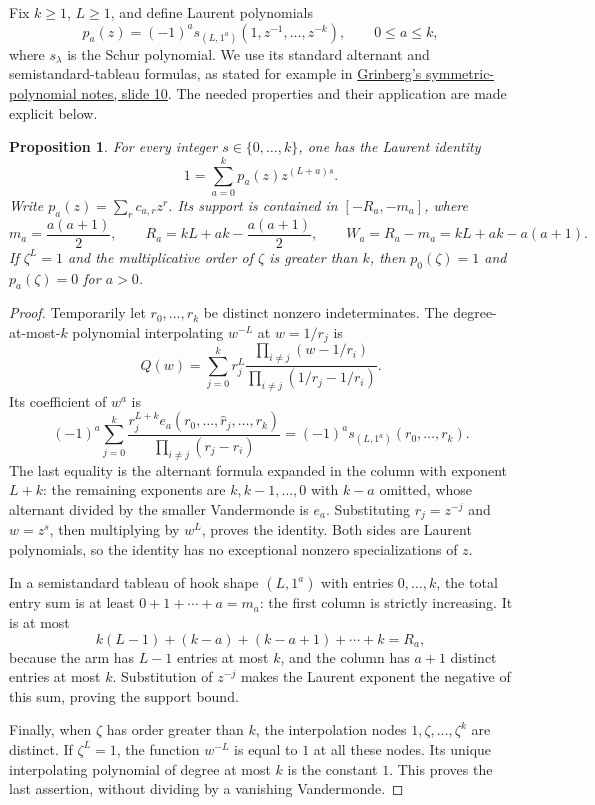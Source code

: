 \documentclass[11pt]{article}
\newtheorem{proposition}[theorem]{Proposition}
\begin{document}
Fix $k\geq1$, $L\geq1$, and define Laurent polynomials
\[
 p_a(z)=(-1)^a s_{(L,1^a)}(1,z^{-1},\ldots,z^{-k}),
 \qquad 0\leq a\leq k,
\]
where $s_\lambda$ is the Schur polynomial. We use its standard
alternant and semistandard-tableau formulas, as stated for example in
\href{https://www.cip.ifi.lmu.de/~grinberg/algebra/umn2019.pdf}{Grinberg's
symmetric-polynomial notes, slide 10}. The needed properties and their
application are made explicit below.

\begin{proposition}\label{prop:hook-switch}
For every integer $s\in\{0,\ldots,k\}$, one has the Laurent identity
\[
 1=\sum_{a=0}^k p_a(z)z^{(L+a)s}.
\]
Write $p_a(z)=\sum_r c_{a,r}z^r$. Its support is contained in
$[-R_a,-m_a]$, where
\[
 m_a=\frac{a(a+1)}2,\qquad
 R_a=kL+ak-\frac{a(a+1)}2,\qquad
 W_a=R_a-m_a=kL+ak-a(a+1).
\]
If $\zeta^L=1$ and the multiplicative order of $\zeta$ is greater
than $k$, then $p_0(\zeta)=1$ and $p_a(\zeta)=0$ for $a>0$.
\end{proposition}

\begin{proof}
Temporarily let $r_0,\ldots,r_k$ be distinct nonzero indeterminates.
The degree-at-most-$k$ polynomial interpolating $w^{-L}$ at
$w=1/r_j$ is
\[
 Q(w)=\sum_{j=0}^k r_j^L
       \frac{\prod_{i\ne j}(w-1/r_i)}
            {\prod_{i\ne j}(1/r_j-1/r_i)}.
\]
Its coefficient of $w^a$ is
\[
 (-1)^a\sum_{j=0}^k
 \frac{r_j^{L+k}e_a(r_0,\ldots,\widehat r_j,\ldots,r_k)}
      {\prod_{i\ne j}(r_j-r_i)}
 =(-1)^a s_{(L,1^a)}(r_0,\ldots,r_k).
\]
The last equality is the alternant formula expanded in the column
with exponent $L+k$: the remaining exponents are
$k,k-1,\ldots,0$ with $k-a$ omitted, whose alternant divided by the
smaller Vandermonde is $e_a$. Substituting $r_j=z^{-j}$ and
$w=z^s$, then multiplying by $w^L$, proves the identity. Both sides
are Laurent polynomials, so the identity has no exceptional nonzero
specializations of $z$.

In a semistandard tableau of hook shape $(L,1^a)$ with entries
$0,\ldots,k$, the total entry sum is at least $0+1+\cdots+a=m_a$:
the first column is strictly increasing. It is at most
\[
 k(L-1)+(k-a)+(k-a+1)+\cdots+k=R_a,
\]
because the arm has $L-1$ entries at most $k$, and the column has
$a+1$ distinct entries at most $k$. Substitution of $z^{-j}$ makes
the Laurent exponent the negative of this sum, proving the support
bound.

Finally, when $\zeta$ has order greater than $k$, the interpolation
nodes $1,\zeta,\ldots,\zeta^k$ are distinct. If $\zeta^L=1$, the
function $w^{-L}$ is equal to $1$ at all these nodes. Its unique
interpolating polynomial of degree at most $k$ is the constant $1$.
This proves the last assertion, without dividing by a vanishing
Vandermonde.
\end{proof}
\end{document}
